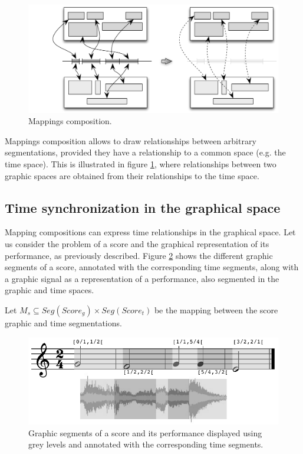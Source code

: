 \documentclass[letterpaper, 12pt]{article}
\newcommand{\seg}[1]			{Seg(#1)}
\begin{document}
\begin{figure} %
\begin{center}
	\includegraphics[width=0.9\baseimgwidth]{imgs/composition4}
\caption{Mappings composition.}
\label{fig:composition}
\end{center}
\end{figure}

Mappings composition allows to draw relationships between arbitrary segmentations, provided they have a relationship to a common space (e.g. the time space). This is illustrated in figure \ref{fig:composition}, where relationships between two graphic spaces are obtained from their relationships to the time space.

\subsection{Time synchronization in the graphical space}\label{subsec:graphsync}


Mapping compositions can express time relationships in the graphical space. Let us consider the problem of a score and the graphical representation of its performance, as previously described. %
Figure \ref{fig:ex1-score} shows the different graphic segments of a score, annotated with the corresponding time segments, along with a graphic signal as a representation of a performance, also segmented in the graphic and time spaces.

Let $M_s\subseteq \seg{Score_{g}}\times \seg{Score_{t}}$ be the mapping between the score graphic and time segmentations.

\begin{figure} %
\begin{center}
	\includegraphics[width=0.9\baseimgwidth]{imgs/segmentation}
\caption{Graphic segments of a score and its performance displayed using grey levels and annotated with the corresponding time segments.}
\label{fig:ex1-score}
\end{center}
\end{figure}
\end{document}
